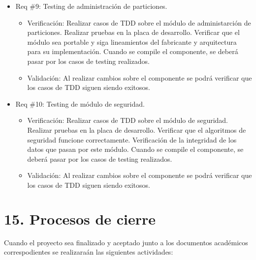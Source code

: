 \documentclass[
11pt, %
]{charter}
\begin{document}
\begin{itemize} 
\item Req \#9: Testing de administración de particiones.

\begin{itemize}
	\item Verificación: Realizar casos de TDD sobre el módulo de administarción de particiones. Realizar pruebas en la placa de desarrollo. Verificar que el módulo sea portable y siga lineamientos del fabricante y arquitectura para su implementación. Cuando se compile el componente, se deberá pasar por los casos de testing realizados.
	\item Validación: Al realizar cambios sobre el componente se podrá verificar que los casos de TDD siguen siendo exitosos.
\end{itemize}

\end{itemize}
\newpage

\begin{itemize} 
\item Req \#10: Testing de módulo de seguridad.

\begin{itemize}
	\item Verificación: Realizar casos de TDD sobre el módulo de seguridad. Realizar pruebas en la placa de desarrollo. Verificar que el algoritmos de seguridad funcione correctamente. Verificación de la integridad de los datos que pasan por este módulo. Cuando se compile el componente, se deberá pasar por los casos de testing realizados.
	\item Validación: Al realizar cambios sobre el componente se podrá verificar que los casos de TDD siguen siendo exitosos.
\end{itemize}

\end{itemize}

\section{15. Procesos de cierre}    
\label{sec:cierre}

Cuando el proyecto sea finalizado y aceptado junto a los documentos académicos correspodientes se realizaraán las siguientes actividades:
\end{document}
